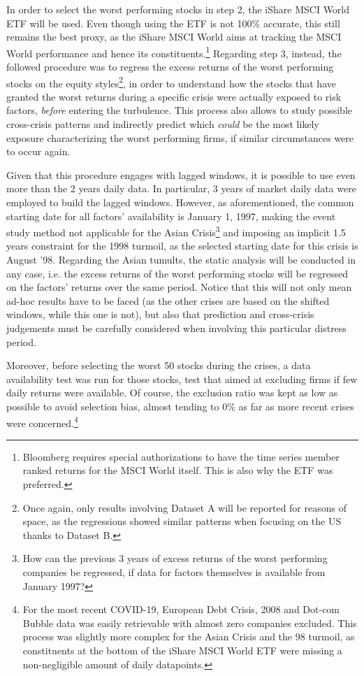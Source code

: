 \documentclass[12pt]{article}
\begin{document}
In order to select the worst performing stocks in step 2, the iShare MSCI World ETF will be used. Even though using the ETF is not 100\% accurate, this still remains the best proxy, as the iShare MSCI World aims at tracking the MSCI World performance and hence its constituents.\footnote{Bloomberg requires special authorizations to have the time series member ranked returns for the MSCI World itself. This is also why the ETF was preferred.} Regarding step 3, instead, the followed procedure was to regress the excess returns of the worst performing stocks on the equity styles\footnote{Once again, only results involving Dataset A will be reported for reasons of space, as the regressions showed similar patterns when focusing on the US thanks to Dataset B.}, in order to understand how the stocks that have granted the worst returns during a specific crisis were actually exposed to risk factors, \textit{before} entering the turbulence. This process also allows to study possible cross-crisis patterns and indirectly predict which \textit{could} be the most likely exposure characterizing the worst performing firms, if similar circumstances were to occur again.

Given that this procedure engages with lagged windows, it is possible to use even more than the 2 years daily data. In particular, 3 years of market daily data were employed to build the lagged windows. However, as aforementioned, the common starting date for all factors' availability is January 1, 1997, making the event study method not applicable for the Asian Crisis\footnote{How can the previous 3 years of excess returns of the worst performing companies be regressed, if data for factors themselves is available from January 1997?} and imposing an implicit 1.5 years constraint for the 1998 turmoil, as the selected starting date for this crisis is August '98. Regarding the Asian tumults, the static analysis will be conducted in any case, i.e. the excess returns of the worst performing stocks will be regressed on the factors' returns over the same period. Notice that this will not only mean ad-hoc results have to be faced (as the other crises are based on the shifted windows, while this one is not), but also that prediction and cross-crisis judgements must be carefully considered when involving this particular distress period.

Moreover, before selecting the worst 50 stocks during the crises, a data availability test was run for those stocks, test that aimed at excluding firms if few daily returns were available. Of course, the exclusion ratio was kept as low as possible to avoid selection bias, almost tending to 0\% as far as more recent crises were concerned.\footnote{For the most recent COVID-19, European Debt Crisis, 2008 and Dot-com Bubble data was easily retrievable with almost zero companies excluded. This process was slightly more complex for the Asian Crisis and the 98 turmoil, as constituents at the bottom of the iShare MSCI World ETF were missing a non-negligible amount of daily datapoints.}
\end{document}
